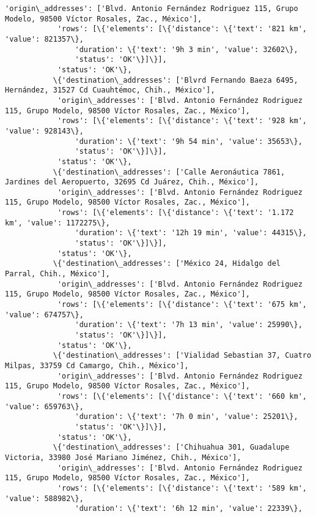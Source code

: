 \documentclass[11pt]{article}
\begin{document}
\begin{Verbatim}[commandchars=\\\{\}]
            'origin\_addresses': ['Blvd. Antonio Fernández Rodriguez 115, Grupo Modelo, 98500 Víctor Rosales, Zac., México'],
            'rows': [\{'elements': [\{'distance': \{'text': '821 km', 'value': 821357\},
                'duration': \{'text': '9h 3 min', 'value': 32602\},
                'status': 'OK'\}]\}],
            'status': 'OK'\},
           \{'destination\_addresses': ['Blvrd Fernando Baeza 6495, Hernández, 31527 Cd Cuauhtémoc, Chih., México'],
            'origin\_addresses': ['Blvd. Antonio Fernández Rodriguez 115, Grupo Modelo, 98500 Víctor Rosales, Zac., México'],
            'rows': [\{'elements': [\{'distance': \{'text': '928 km', 'value': 928143\},
                'duration': \{'text': '9h 54 min', 'value': 35653\},
                'status': 'OK'\}]\}],
            'status': 'OK'\},
           \{'destination\_addresses': ['Calle Aeronáutica 7861, Jardines del Aeropuerto, 32695 Cd Juárez, Chih., México'],
            'origin\_addresses': ['Blvd. Antonio Fernández Rodriguez 115, Grupo Modelo, 98500 Víctor Rosales, Zac., México'],
            'rows': [\{'elements': [\{'distance': \{'text': '1.172 km', 'value': 1172275\},
                'duration': \{'text': '12h 19 min', 'value': 44315\},
                'status': 'OK'\}]\}],
            'status': 'OK'\},
           \{'destination\_addresses': ['México 24, Hidalgo del Parral, Chih., México'],
            'origin\_addresses': ['Blvd. Antonio Fernández Rodriguez 115, Grupo Modelo, 98500 Víctor Rosales, Zac., México'],
            'rows': [\{'elements': [\{'distance': \{'text': '675 km', 'value': 674757\},
                'duration': \{'text': '7h 13 min', 'value': 25990\},
                'status': 'OK'\}]\}],
            'status': 'OK'\},
           \{'destination\_addresses': ['Vialidad Sebastian 37, Cuatro Milpas, 33759 Cd Camargo, Chih., México'],
            'origin\_addresses': ['Blvd. Antonio Fernández Rodriguez 115, Grupo Modelo, 98500 Víctor Rosales, Zac., México'],
            'rows': [\{'elements': [\{'distance': \{'text': '660 km', 'value': 659763\},
                'duration': \{'text': '7h 0 min', 'value': 25201\},
                'status': 'OK'\}]\}],
            'status': 'OK'\},
           \{'destination\_addresses': ['Chihuahua 301, Guadalupe Victoria, 33980 José Mariano Jiménez, Chih., México'],
            'origin\_addresses': ['Blvd. Antonio Fernández Rodriguez 115, Grupo Modelo, 98500 Víctor Rosales, Zac., México'],
            'rows': [\{'elements': [\{'distance': \{'text': '589 km', 'value': 588982\},
                'duration': \{'text': '6h 12 min', 'value': 22339\},

\end{Verbatim}
\end{document}
